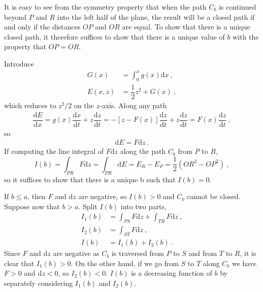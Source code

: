 \documentclass[12pt,a4paper]{article}
\newcommand{\dif}{\mathrm{d}}
\begin{document}
It is easy to see from the symmetry property that when the path $C_b$ is continued beyond $P$ and $R$ into the left half of the plane, the result will be a closed path if and only if the distances $OP$ and $OR$ are equal. To show that there is a unique closed path, it therefore suffices to show that there is a unique value of $b$ with the property that $OP=OR$.

Introduce
\begin{align*}
G(x) &= \int_0^x g(x) \dif x ~, \\
E(x,z) &= \dfrac{1}{2} z^2 +G(x) ~,
\end{align*}
which reduces to $z^2/2$ on the $z$-axis. Along any path
\begin{align*}
\dfrac{\dif E}{\dif x}  = g(x) \dfrac{\dif x}{\dif t} +z \dfrac{\dif z}{\dif t} = -[z-F(x)] \dfrac{\dif z}{\dif t}  +z\dfrac{\dif z}{\dif t}  = F(x) \dfrac{\dif z}{\dif t} ~,
\end{align*}
so
\begin{align*}
\dif E = F \dif z ~.
\end{align*}
If computing the line integral of $F \dif z$ along the path $C_b$ from $P$ to $R$, 
\begin{equation}
I(b) = \int_{PR} F \dif z = \int_{PR} \dif E = E_R -E_P = \dfrac{1}{2}(OR^2 -OP^2) ~,
\end{equation}
so it suffices to show that there is a unique b such that $I(b)=0$.

If $b \leqslant a$, then $F$ and $\dif z$ are negative, so $I(b) > 0$ and $C_b$ cannot be closed. Suppose now that $b > a$. Split $I(b)$ into two parts,
\begin{align*}
I_1(b) &= \int_{PS} F \dif z +\int_{TR} F \dif z ~, \\
I_2(b) &= \int_{ST} F \dif z ~, \\
I(b) &= I_1(b) +I_2(b) ~.
\end{align*}
Since $F$ and $\dif z$ are negative as $C_b$ is traversed from $P$ to $S$ and from $T$ to $R$, it is clear that $I_1(b) > 0$. On the other hand, if we go from $S$ to $T$ along $C_b$ we have $F > 0$ and $\dif z < 0$, so $I_2(b) < 0$. $I(b)$ is a decreasing function of $b$ by separately considering $I_1(b)$ and $I_2(b)$.
\end{document}
